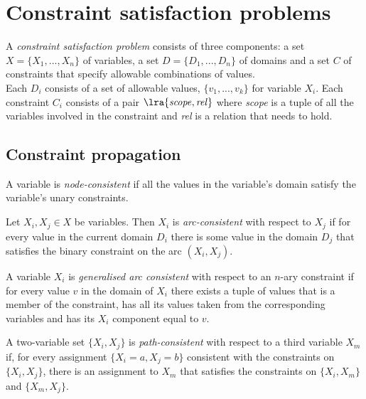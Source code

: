 \documentclass{article}
\begin{document}
\section{Constraint satisfaction problems}

\begin{definition}
    A \emph{constraint satisfaction problem} consists of three components:
    a set $X=\{X_1, ..., X_n\}$ of variables, a set $D=\{D_1, ..., D_n\}$ of
    domains and a set $C$ of constraints that specify allowable combinations
    of values.\\
    Each $D_i$ consists of a set of allowable values, $\{v_1, ..., v_k\}$
    for variable $X_i$. Each constraint $C_i$ consists of a pair 
    $\lra{\text{\emph{scope}}, \text{\emph{rel}}}$ where \emph{scope} is a
    tuple of all the variables involved in the constraint and \emph{rel} is a
    relation that needs to hold.
\end{definition}

\subsection{Constraint propagation}

\begin{definition}
    A variable is \emph{node-consistent} if all the values in the variable's
    domain satisfy the variable's unary constraints.
\end{definition}

\begin{definition}
    Let $X_i,X_j\in X$ be variables. Then $X_i$ is \emph{arc-consistent} with
    respect to $X_j$ if for every value in the current domain $D_i$ there is some
    value in the domain $D_j$ that satisfies the binary constraint on the arc
    $(X_i, X_j)$.
\end{definition}

\begin{definition}
    A variable $X_i$ is \emph{generalised arc consistent} with respect to
    an $n$-ary constraint if for every value $v$ in the domain of $X_i$ there
    exists a tuple of values that is a member of the constraint, has all its values
    taken from the corresponding variables and has its $X_i$ component equal to $v$.
\end{definition}

\begin{definition}
    A two-variable set $\{X_i, X_j\}$ is \emph{path-consistent} with respect to a
    third variable $X_m$ if, for every assignment $\{X_i=a,X_j=b\}$ consistent with
    the constraints on $\{X_i,X_j\}$, there is an assignment to $X_m$ that satisfies
    the constraints on $\{X_i,X_m\}$ and $\{X_m,X_j\}$.
\end{definition}
\end{document}
